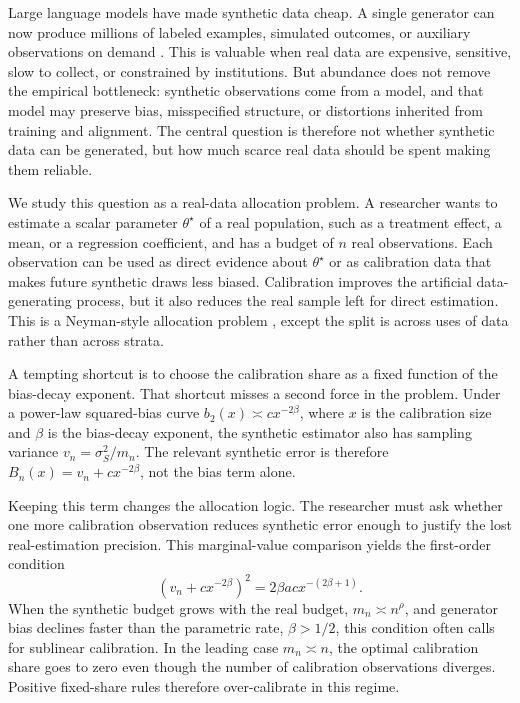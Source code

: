 \label{sec:intro}

Large language models have made synthetic data cheap. A single generator can now produce millions of labeled examples, simulated outcomes, or auxiliary observations on demand \citep{kaplan2020scaling,hoffmann2022chinchilla}. This is valuable when real data are expensive, sensitive, slow to collect, or constrained by institutions. But abundance does not remove the empirical bottleneck: synthetic observations come from a model, and that model may preserve bias, misspecified structure, or distortions inherited from training and alignment. The central question is therefore not whether synthetic data can be generated, but how much scarce real data should be spent making them reliable.

We study this question as a real-data allocation problem. A researcher wants to estimate a scalar parameter $\theta^\star$ of a real population, such as a treatment effect, a mean, or a regression coefficient, and has a budget of $n$ real observations. Each observation can be used as direct evidence about $\theta^\star$ or as calibration data that makes future synthetic draws less biased. Calibration improves the artificial data-generating process, but it also reduces the real sample left for direct estimation. This is a Neyman-style allocation problem \citep{neyman1934}, except the split is across uses of data rather than across strata.

A tempting shortcut is to choose the calibration share as a fixed function of the bias-decay exponent. That shortcut misses a second force in the problem. Under a power-law squared-bias curve $b_2(x) \asymp c x^{-2\beta}$, where $x$ is the calibration size and $\beta$ is the bias-decay exponent, the synthetic estimator also has sampling variance $v_n=\sigma_S^2/m_n$. The relevant synthetic error is therefore $B_n(x)=v_n+cx^{-2\beta}$, not the bias term alone.

Keeping this term changes the allocation logic. The researcher must ask whether one more calibration observation reduces synthetic error enough to justify the lost real-estimation precision. This marginal-value comparison yields the first-order condition
\[
  (v_n+c x^{-2\beta})^2 = 2\beta a c x^{-(2\beta+1)}.
\]
When the synthetic budget grows with the real budget, $m_n \asymp n^\rho$, and generator bias declines faster than the parametric rate, $\beta>1/2$, this condition often calls for sublinear calibration. In the leading case $m_n\asymp n$, the optimal calibration share goes to zero even though the number of calibration observations diverges. Positive fixed-share rules therefore over-calibrate in this regime.


